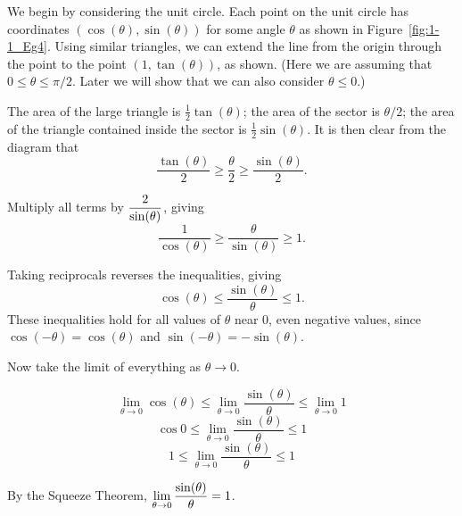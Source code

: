 \begin{activitySolution}
	We begin by considering the unit circle. Each point on the unit circle has coordinates $(\cos (\theta),\sin (\theta))$ for some angle $\theta$ as shown in Figure~\ref{fig:1-1_Eg4}. Using similar triangles, we can extend the line from the origin through the point to the point $(1,\tan (\theta))$, as shown. (Here we are assuming that $0 \leq \theta \leq \pi/2$. Later we will show that we can also consider $\theta \leq 0$.)

The area of the large triangle is $\frac{1}{2} \tan(\theta)$; the area of the sector is $\theta/2$; the area of the triangle contained inside the sector is $\frac{1}{2} \sin(\theta)$. It is then clear from the diagram that 
\[ \frac{\tan (\theta)}{2} \geq \frac{\theta}{2} \geq \frac{\sin (\theta)}{2}.\]

Multiply all terms by $\displaystyle \frac{2}{\sin(\theta)}$, giving 
\[ \frac{1}{\cos(\theta)} \geq \frac{\theta}{\sin (\theta)} \geq 1.\]

Taking reciprocals reverses the inequalities, giving 
\[ \cos (\theta) \leq \frac{\sin(\theta)}{\theta} \leq 1.\]
These inequalities hold for all values of $\theta$ near 0, even negative values, since $\cos (-\theta) = \cos(\theta)$ and $\sin (-\theta) = -\sin (\theta)$.

Now take the limit of everything as $\theta \to 0$.

\[ \lim_{\theta \to 0} \cos (\theta) \leq \lim_{\theta \to 0} \frac{\sin(\theta)}{\theta} \leq \lim_{\theta \to 0}  1 \]
\[ \cos 0 \leq \lim_{\theta \to 0} \frac{\sin(\theta)}{\theta} \leq  1 \]
\[ 1 \leq \lim_{\theta \to 0} \frac{\sin(\theta)}{\theta} \leq  1 \]

By the Squeeze Theorem, $\displaystyle \lim_{\theta \to 0} \frac{\sin(\theta)}{\theta}=1$.
\end{activitySolution}
\aftera

